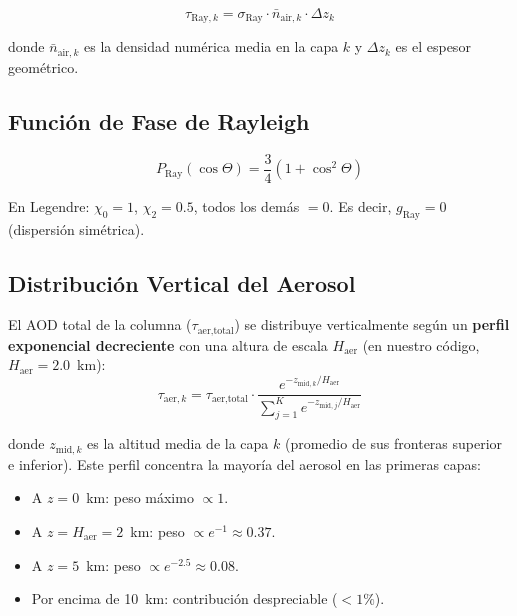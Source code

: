 \documentclass[a4paper,11pt]{article}
\begin{document}
\begin{equation}
    \tau_{\text{Ray},k} = \sigma_{\text{Ray}} \cdot \bar{n}_{\text{air},k}
    \cdot \Delta z_k
\end{equation}

donde $\bar{n}_{\text{air},k}$ es la densidad num\'erica media en la capa $k$
y $\Delta z_k$ es el espesor geom\'etrico.

\subsection{Funci\'on de Fase de Rayleigh}

\begin{equation}
    P_{\text{Ray}}(\cos\Theta) = \frac{3}{4}(1 + \cos^2\Theta)
\end{equation}

En Legendre: $\chi_0 = 1$, $\chi_2 = 0.5$, todos los dem\'as $= 0$.
Es decir, $g_{\text{Ray}} = 0$ (dispersi\'on sim\'etrica).

\subsection{Distribuci\'on Vertical del Aerosol}\label{sec:aer_vertical}

El AOD total de la columna ($\tau_{\text{aer,total}}$) se distribuye
verticalmente seg\'un un \textbf{perfil exponencial decreciente} con una
altura de escala $H_{\text{aer}}$ (en nuestro c\'odigo, $H_{\text{aer}} = 2.0$~km):
\begin{equation}\label{eq:aer_profile}
    \tau_{\text{aer},k} = \tau_{\text{aer,total}} \cdot
    \frac{e^{-z_{\text{mid},k} / H_{\text{aer}}}}
    {\sum_{j=1}^{K} e^{-z_{\text{mid},j} / H_{\text{aer}}}}
\end{equation}

donde $z_{\text{mid},k}$ es la altitud media de la capa $k$
(promedio de sus fronteras superior e inferior).  Este perfil concentra la
mayor\'ia del aerosol en las primeras capas:
\begin{itemize}
    \item A $z = 0$~km: peso m\'aximo $\propto 1$.
    \item A $z = H_{\text{aer}} = 2$~km: peso $\propto e^{-1} \approx 0.37$.
    \item A $z = 5$~km: peso $\propto e^{-2.5} \approx 0.08$.
    \item Por encima de 10~km: contribuci\'on despreciable ($< 1\%$).
\end{itemize}
\end{document}
